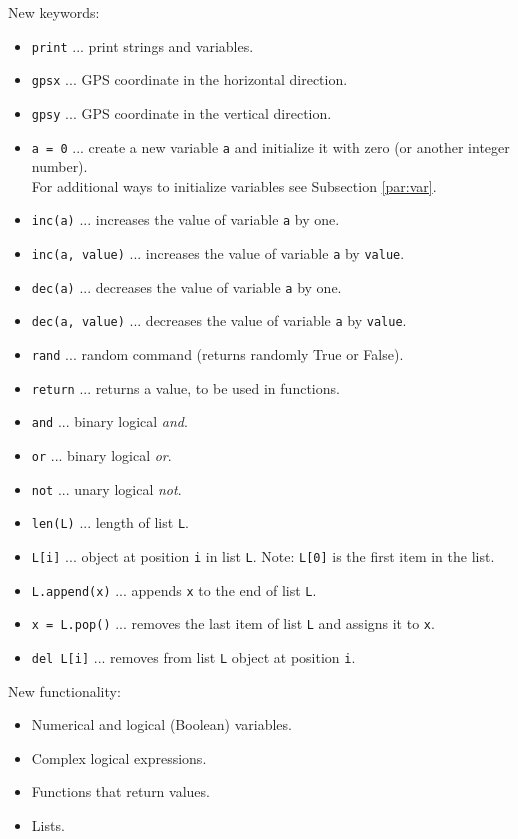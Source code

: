 New keywords:
\begin{itemize}
\item {\tt print} ... print strings and variables.
\item {\tt gpsx} ... GPS coordinate in the horizontal direction.
\item {\tt gpsy} ... GPS coordinate in the vertical direction.
\item {\tt a = 0} ... create a new variable {\tt a} and initialize it with zero (or another 
      integer number).\\ For additional ways to initialize variables see Subsection \ref{par:var}.
\item {\tt inc(a)} ... increases the value of variable {\tt a} by one.
\item {\tt inc(a, value)} ... increases the value of variable {\tt a} by {\tt value}.
\item {\tt dec(a)} ... decreases the value of variable {\tt a} by one.
\item {\tt dec(a, value)} ... decreases the value of variable {\tt a} by {\tt value}.
\item {\tt rand} ... random command (returns randomly True or False).
\item {\tt return} ... returns a value, to be used in functions.
\item {\tt and} ... binary logical {\em and}.
\item {\tt or} ... binary logical {\em or}.
\item {\tt not} ... unary logical {\em not}.
\item {\tt len(L)} ... length of list {\tt L}.
\item {\tt L[i]} ... object at position {\tt i} in list {\tt L}. Note: {\tt L[0]} is the first item in the list.
\item {\tt L.append(x)} ... appends {\tt x} to the end of list {\tt L}.
\item {\tt x = L.pop()} ... removes the last item of list {\tt L} and assigns it to {\tt x}.
\item {\tt del L[i]} ... removes from list {\tt L} object at position {\tt i}. 
\end{itemize}
New functionality:
\begin{itemize}
\item Numerical and logical (Boolean) variables.
\item Complex logical expressions.
\item Functions that return values.
\item Lists.
\end{itemize}


